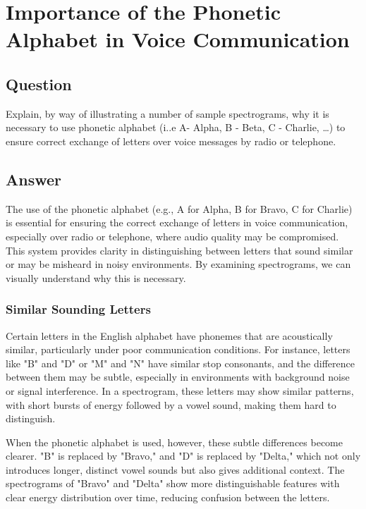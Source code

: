 
\section{Importance of the Phonetic Alphabet in Voice Communication}

\subsection{Question}
Explain, by way of illustrating a number of sample spectrograms, why it is necessary to use phonetic alphabet (i..e A- Alpha, B - Beta, C - Charlie, …) to ensure correct exchange of letters over voice messages by radio or telephone.

\subsection{Answer}
The use of the phonetic alphabet (e.g., A for Alpha, B for Bravo, C for Charlie) is essential for ensuring the correct exchange of letters in voice communication, especially over radio or telephone, where audio quality may be compromised. This system provides clarity in distinguishing between letters that sound similar or may be misheard in noisy environments. By examining spectrograms, we can visually understand why this is necessary.

\subsubsection*{Similar Sounding Letters}
Certain letters in the English alphabet have phonemes that are acoustically similar, particularly under poor communication conditions. For instance, letters like "B" and "D" or "M" and "N" have similar stop consonants, and the difference between them may be subtle, especially in environments with background noise or signal interference. In a spectrogram, these letters may show similar patterns, with short bursts of energy followed by a vowel sound, making them hard to distinguish.

When the phonetic alphabet is used, however, these subtle differences become clearer. "B" is replaced by "Bravo," and "D" is replaced by "Delta," which not only introduces longer, distinct vowel sounds but also gives additional context. The spectrograms of "Bravo" and "Delta" show more distinguishable features with clear energy distribution over time, reducing confusion between the letters.


